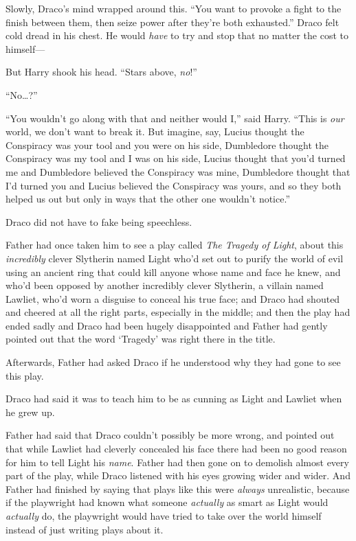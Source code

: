 Slowly, Draco’s mind wrapped around this. “You want to provoke a fight to the finish between them, then seize power after they’re both exhausted.” Draco felt cold dread in his chest. He would \emph{have} to try and stop that no matter the cost to himself—

But Harry shook his head. “Stars above, \emph{no}!”

“No…?”

“You wouldn’t go along with that and neither would I,” said Harry. “This is \emph{our} world, we don’t want to break it. But imagine, say, Lucius thought the Conspiracy was your tool and you were on his side, Dumbledore thought the Conspiracy was my tool and I was on his side, Lucius thought that you’d turned me and Dumbledore believed the Conspiracy was mine, Dumbledore thought that I’d turned you and Lucius believed the Conspiracy was yours, and so they both helped us out but only in ways that the other one wouldn’t notice.”

Draco did not have to fake being speechless.

Father had once taken him to see a play called \emph{The Tragedy of Light}, about this \emph{incredibly} clever Slytherin named Light who’d set out to purify the world of evil using an ancient ring that could kill anyone whose name and face he knew, and who’d been opposed by another incredibly clever Slytherin, a villain named Lawliet, who’d worn a disguise to conceal his true face; and Draco had shouted and cheered at all the right parts, especially in the middle; and then the play had ended sadly and Draco had been hugely disappointed and Father had gently pointed out that the word ‘Tragedy’ was right there in the title.

Afterwards, Father had asked Draco if he understood why they had gone to see this play.

Draco had said it was to teach him to be as cunning as Light and Lawliet when he grew up.

Father had said that Draco couldn’t possibly be more wrong, and pointed out that while Lawliet had cleverly concealed his face there had been no good reason for him to tell Light his \emph{name}. Father had then gone on to demolish almost every part of the play, while Draco listened with his eyes growing wider and wider. And Father had finished by saying that plays like this were \emph{always} unrealistic, because if the playwright had known what someone \emph{actually} as smart as Light would \emph{actually} do, the playwright would have tried to take over the world himself instead of just writing plays about it.

